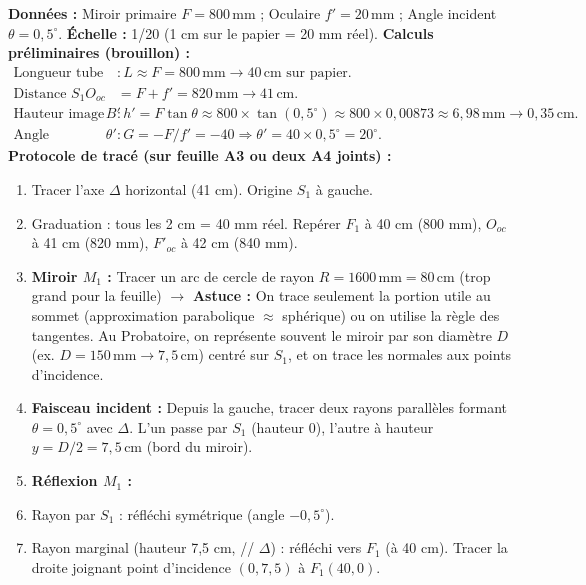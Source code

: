\documentclass[11pt]{article}
\begin{document}
\begin{exemplebox}
\textbf{Données :} Miroir primaire $F = 800\,\text{mm}$ ; Oculaire $f' = 20\,\text{mm}$ ; Angle incident $\theta = 0,5^\circ$. \textbf{Échelle :} 1/20 (1 cm sur le papier = 20 mm réel).
\textbf{Calculs préliminaires (brouillon) :}
\begin{align*}
    \text{Longueur tube (approx)} & : L \approx F = 800\,\text{mm} \rightarrow 40\,\text{cm sur papier.} \\
    \text{Distance } S_1O_{oc} & = F + f' = 820\,\text{mm} \rightarrow 41\,\text{cm.} \\
    \text{Hauteur image } B' & : h' = F \tan\theta \approx 800 \times \tan(0,5^\circ) \approx 800 \times 0,00873 \approx 6,98\,\text{mm} \rightarrow 0,35\,\text{cm.} \\
    \text{Angle émergent } \theta' & : G = -F/f' = -40 \Rightarrow \theta' = 40 \times 0,5^\circ = 20^\circ.
\end{align*}
\textbf{Protocole de tracé (sur feuille A3 ou deux A4 joints) :}
\begin{enumerate}
    \item Tracer l'axe $\Delta$ horizontal (41 cm). Origine $S_1$ à gauche.
    \item Graduation : tous les 2 cm = 40 mm réel. Repérer $F_1$ à 40 cm (800 mm), $O_{oc}$ à 41 cm (820 mm), $F'_{oc}$ à 42 cm (840 mm).
    \item \textbf{Miroir $M_1$ :} Tracer un arc de cercle de rayon $R=1600\,\text{mm}=80\,\text{cm}$ (trop grand pour la feuille) $\rightarrow$ \textbf{Astuce :} On trace seulement la portion utile au sommet (approximation parabolique $\approx$ sphérique) ou on utilise la règle des tangentes. Au Probatoire, on représente souvent le miroir par son diamètre $D$ (ex. $D=150\,\text{mm} \to 7,5\,\text{cm}$) centré sur $S_1$, et on trace les normales aux points d'incidence.
    \item \textbf{Faisceau incident :} Depuis la gauche, tracer deux rayons parallèles formant $\theta=0,5^\circ$ avec $\Delta$. L'un passe par $S_1$ (hauteur 0), l'autre à hauteur $y = D/2 = 7,5\,\text{cm}$ (bord du miroir).
    \item \textbf{Réflexion $M_1$ :}
        \item Rayon par $S_1$ : réfléchi symétrique (angle $-0,5^\circ$).
        \item Rayon marginal (hauteur 7,5 cm, // $\Delta$) : réfléchi vers $F_1$ (à 40 cm). Tracer la droite joignant point d'incidence $(0, 7,5)$ à $F_1(40, 0)$.

\end{enumerate}
\end{exemplebox}
\end{document}
